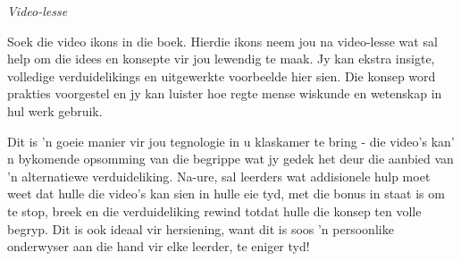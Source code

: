 \newpage
\thispagestyle{empty}

{\normalfont\sffamily\fontsize{22}\normalfont\itshape Video-lesse} \par

{\Large
% 
% 
Soek die video ikons in die boek. Hierdie ikons neem jou na video-lesse wat sal help om die idees en konsepte vir jou lewendig te maak. Jy kan ekstra insigte, volledige verduidelikings en uitgewerkte voorbeelde hier sien. Die konsep word prakties voorgestel en jy kan luister hoe regte mense wiskunde en wetenskap in hul werk gebruik. \par

Dit is 'n goeie manier vir jou tegnologie in u klaskamer te bring - die video's kan' n bykomende opsomming van die begrippe wat jy gedek het deur die aanbied van 'n alternatiewe verduideliking. Na-ure, sal leerders wat addisionele hulp moet weet dat hulle die video's kan sien in hulle eie tyd, met die bonus in staat is om te stop, breek en die verduideliking rewind totdat hulle die konsep ten volle begryp. Dit is ook ideaal vir hersiening, want dit is soos 'n persoonlike onderwyser aan die hand vir elke leerder, te eniger tyd!\par

}
